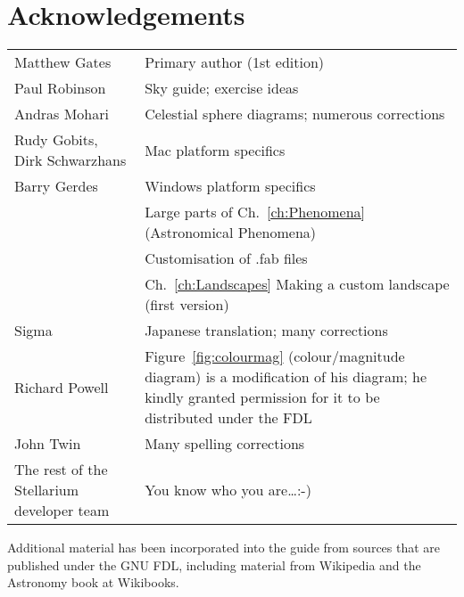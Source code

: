 
\chapter{Acknowledgements}

\begin{longtabu} to \textwidth {l|X}
\toprule
Matthew Gates & Primary author (1st edition)\\
Paul Robinson &Sky guide; exercise ideas\\
Andras Mohari &Celestial sphere diagrams; numerous corrections\\
Rudy Gobits, Dirk Schwarzhans & Mac platform specifics\\
Barry Gerdes&Windows platform specifics \\
            &Large parts of Ch.~\ref{ch:Phenomena} (Astronomical Phenomena)\\
            &Customisation of .fab files\\
            &Ch.~\ref{ch:Landscapes} Making a custom landscape (first version) \\
Sigma       &Japanese translation; many corrections\\ %
Richard Powell& Figure~\ref{fig:colourmag} (colour/magnitude diagram) is a modification of his diagram; he kindly granted permission for it to be distributed under the FDL\\


John Twin & Many spelling corrections \\
The rest of the Stellarium developer team & You know who you are\ldots :-)\tabularnewline
\bottomrule
\end{longtabu}


Additional material has been incorporated into the guide from sources
that are published under the GNU FDL, including material from Wikipedia
and the Astronomy book at Wikibooks.
